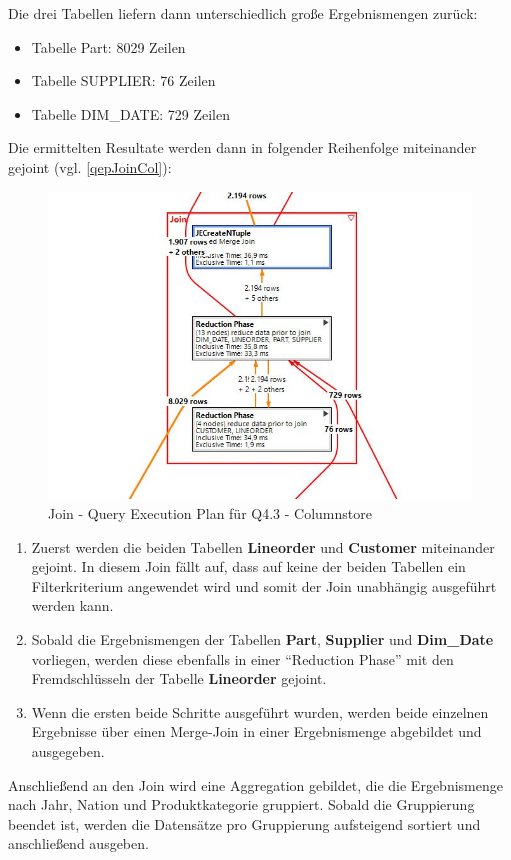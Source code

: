 Die drei Tabellen liefern dann unterschiedlich große Ergebnismengen zurück:
\begin{itemize}
	\item Tabelle Part:			8029 Zeilen
	\item Tabelle SUPPLIER:		76 Zeilen
	\item Tabelle DIM\_DATE:	729 Zeilen
\end{itemize}
Die ermittelten Resultate werden dann in folgender Reihenfolge miteinander gejoint (vgl. \autoref{qepJoinCol}):
\begin{figure}
	\centering
	\includegraphics[scale=0.6]{images/colq43join}
	\caption{Join - Query Execution Plan für Q4.3 - Columnstore \label{qepJoinCol} }
\end{figure}
\begin{enumerate}
	\item Zuerst werden die beiden Tabellen \textbf{Lineorder} und \textbf{Customer} miteinander gejoint. In diesem Join fällt auf, dass auf keine der beiden Tabellen ein Filterkriterium angewendet wird und somit der Join unabhängig ausgeführt werden kann. 
	\item Sobald die Ergebnismengen der Tabellen \textbf{Part}, \textbf{Supplier} und \textbf{Dim\_Date} vorliegen, werden diese ebenfalls in einer \enquote{Reduction Phase} mit den Fremdschlüsseln der Tabelle \textbf{Lineorder} gejoint. 
	\item Wenn die ersten beide Schritte ausgeführt wurden, werden beide einzelnen Ergebnisse über einen Merge-Join in einer Ergebnismenge abgebildet und ausgegeben. 
\end{enumerate}
Anschließend an den Join wird eine Aggregation gebildet, die die Ergebnismenge nach Jahr, Nation und Produktkategorie gruppiert. Sobald die Gruppierung beendet ist, werden die Datensätze pro Gruppierung aufsteigend sortiert und anschließend ausgeben.


